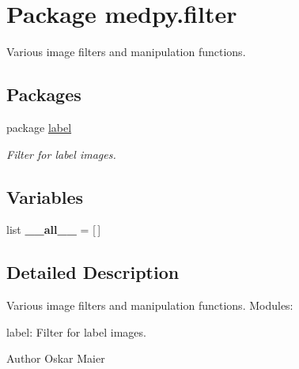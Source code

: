 \hypertarget{namespacemedpy_1_1filter}{
\section{Package medpy.filter}
\label{namespacemedpy_1_1filter}
}


Various image filters and manipulation functions.  


\subsection*{Packages}
\begin{DoxyCompactItemize}
\item 
package \hyperlink{namespacemedpy_1_1filter_1_1label}{label}


\begin{DoxyCompactList}\small\item\em Filter for label images. \end{DoxyCompactList}

\end{DoxyCompactItemize}
\subsection*{Variables}
\begin{DoxyCompactItemize}
\item 
\hypertarget{namespacemedpy_1_1filter_af98280c77b5cb80295dbd6dc8d4c4831}{
list {\bfseries \_\-\_\-all\_\-\_\-} = \mbox{[}$\,$\mbox{]}}
\label{namespacemedpy_1_1filter_af98280c77b5cb80295dbd6dc8d4c4831}

\end{DoxyCompactItemize}


\subsection{Detailed Description}
Various image filters and manipulation functions. Modules:
\begin{DoxyItemize}
\item label: Filter for label images.
\end{DoxyItemize}

\begin{DoxyAuthor}{Author}
Oskar Maier 
\end{DoxyAuthor}
